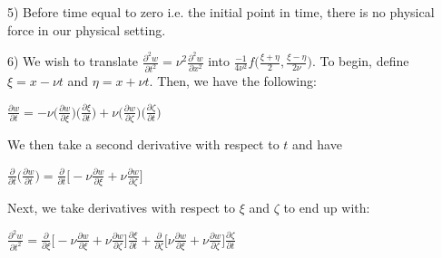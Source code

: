 \documentclass[executivepaper]{article}
\begin{document}
\vspace{3mm}

\begin{flushleft}

5) Before time equal to zero i.e. the initial point in time, there is no physical force in our physical setting. 

\end{flushleft}

\begin{flushleft}

6) We wish to translate $\frac{\partial^2 w}{\partial t^2}=\nu^2\frac{\partial^2 w}{\partial x^2}$ into $\frac{-1}{4\nu^2}f\bigg(\frac{\xi+\eta}{2}, \frac{\xi-\eta}{2\nu}\bigg)$. To begin, define $\xi=x-\nu t$ and $\eta=x+\nu t$. Then, we have the following:

\pagebreak

\vspace*{-40mm}

\begin{center}

$\frac{\partial w}{\partial t}=-\nu \bigg(\frac{\partial w}{\partial \xi}\bigg) \bigg(\frac{\partial \xi}{\partial t}\bigg) + \nu \bigg(\frac{\partial w}{\partial \zeta}\bigg) \bigg(\frac{\partial \zeta}{\partial t}\bigg)$

\vspace{3mm}

We then take a second derivative with respect to $t$ and have

\vspace{3mm}

$\frac{\partial}{\partial t}\bigg(\frac{\partial w}{\partial t}\bigg)= \frac{\partial}{\partial t} \bigg[-\nu \frac{\partial w}{\partial \xi} + \nu \frac{\partial w}{\partial \zeta}\bigg]$

\vspace{3mm}

Next, we take derivatives with respect to $\xi$ and $\zeta$ to end up with:

\vspace{3mm}

$\frac{\partial^2 w}{\partial t^2}= \frac{\partial }{\partial \xi} \bigg[-\nu \frac{\partial w}{\partial \xi} + \nu \frac{\partial w}{\partial \zeta}\bigg] \frac{\partial \xi}{\partial t}+ \frac{\partial}{\partial \zeta} \bigg[\nu \frac{\partial w}{\partial \xi}+\nu \frac{\partial w}{\partial \zeta}\bigg] \frac{\partial \zeta}{\partial t}$

\vspace{3mm}


\end{center}
\end{flushleft}
\end{document}
